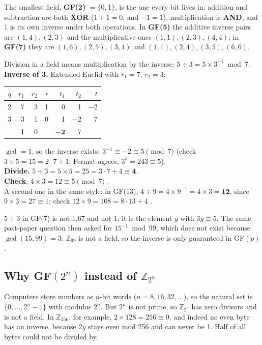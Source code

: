 The smallest field, \textbf{GF(2)} $= \{0, 1\}$, is the one every bit lives in: addition and subtraction are both \textbf{XOR} ($1 + 1 = 0$, and $-1 = 1$), multiplication is \textbf{AND}, and 1 is its own inverse under both operations. In \textbf{GF(5)} the additive inverse pairs are $(1, 4), (2, 3)$ and the multiplicative ones $(1, 1), (2, 3), (4, 4)$; in \textbf{GF(7)} they are $(1, 6), (2, 5), (3, 4)$ and $(1, 1), (2, 4), (3, 5), (6, 6)$.

\begin{worked}
Division in a field means multiplication by the inverse: $5 \div 3 = 5 \times 3^{-1} \bmod 7$.\\
\textbf{Inverse of 3.} Extended Euclid with $r_1 = 7$, $r_2 = 3$:
\begin{center}\small
\begin{tabular}{@{}r|rrr|rrr@{}}
\toprule
$q$ & $r_1$ & $r_2$ & $r$ & $t_1$ & $t_2$ & $t$\\
\midrule
2 & 7 & 3 & 1 & 0 & 1 & $-2$\\
3 & 3 & 1 & 0 & 1 & $-2$ & 7\\
 & \textbf{1} & 0 & & $\mathbf{-2}$ & 7 & \\
\bottomrule
\end{tabular}
\end{center}
$\gcd = 1$, so the inverse exists: $3^{-1} \equiv -2 \equiv 5 \pmod 7$ (check $3 \times 5 = 15 = 2 \cdot 7 + 1$; Fermat agrees, $3^5 = 243 \equiv 5$).\\
\textbf{Divide.} $5 \div 3 = 5 \times 5 = 25 = 3 \cdot 7 + 4 \equiv \mathbf{4}$.\\
\textbf{Check}: $4 \times 3 = 12 \equiv 5 \pmod 7$ \checkmark.\\[2pt]
A second one in the same style: in GF(13), $4 \div 9 = 4 \times 9^{-1} = 4 \times 3 = \mathbf{12}$, since $9 \times 3 = 27 \equiv 1$; check $12 \times 9 = 108 = 8 \cdot 13 + 4$ \checkmark.
\end{worked}

\begin{trap}
$5 \div 3$ in GF(7) is not 1.67 and not 1; it is the element $y$ with $3y \equiv 5$. The same past-paper question then asked for $15^{-1} \bmod 99$, which does not exist because $\gcd(15, 99) = 3$: $\mathbb{Z}_{99}$ is not a field, so the inverse is only guaranteed in GF$(p)$.
\end{trap}

\subsection{Why GF$(2^n)$ instead of $\mathbb{Z}_{2^n}$}
Computers store numbers as $n$-bit words ($n = 8, 16, 32, \dots$), so the natural set is $\{0, \dots, 2^n - 1\}$ with modulus $2^n$. But $2^n$ is not prime, so $\mathbb{Z}_{2^n}$ has zero divisors and is not a field. In $\mathbb{Z}_{256}$, for example, $2 \times 128 = 256 \equiv 0$, and indeed no even byte has an inverse, because $2y$ stays even mod 256 and can never be 1. Half of all bytes could not be divided by.

